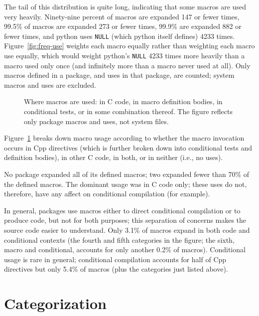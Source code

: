 \documentclass[11pt]{article}
\newcommand{\pkg}[1]{\textsf{#1}}
\begin{document}
The tail of this distribution is quite long, indicating that some macros
are used very heavily.  Ninety-nine percent of macros are expanded 147 or fewer
times, 99.5\% of macros are expanded 273 or fewer times, 99.9\% are
expanded 882 or fewer times, and \pkg{python} uses {\tt NULL} (which \pkg{python}
itself defines) 4233 times.  Figure~\ref{fig:freq-use} weights each macro
equally rather than weighting each macro use equally, which would weight
\pkg{python}'s {\tt NULL} 4233 times more heavily than a macro used only once
(and infinitely more than a macro never used at all).  Only macros defined
in a package, and uses in that package, are counted; system macros and uses
are excluded.


\begin{figure}
\centerline{}
\caption{Where macros are used: in C code, in macro definition bodies, in
  conditional tests, or in some combination thereof.  The figure reflects
  only package macros and uses, not system files.}
\label{fig:where-used}
\end{figure}

Figure~\ref{fig:where-used} breaks down macro usage according to whether
the macro invocation occurs in Cpp directives (which is further broken
down into conditional tests and definition bodies), in other C code, in
both, or in neither (i.e., no uses).

No package expanded all of its defined macros; two expanded fewer than 70\%
of the defined macros.  The dominant usage was in C code only; these uses
do not, therefore, have any affect on conditional compilation (for example).

In general, packages use macros either to direct conditional compilation or
to produce code, but not for both purposes; this separation of concerns
makes the source code easier to understand.  Only 3.1\% of macros expand in
both code and conditional contexts (the fourth and fifth categories in the
figure; the sixth, macro and conditional, accounts for only another 0.2\%
of macros). 
Conditional usage is rare in general; conditional compilation accounts for
half of Cpp directives but only 5.4\% of macros (plus the categories just
listed above).



\section{Categorization}
\label{sec:categorization}
\end{document}
